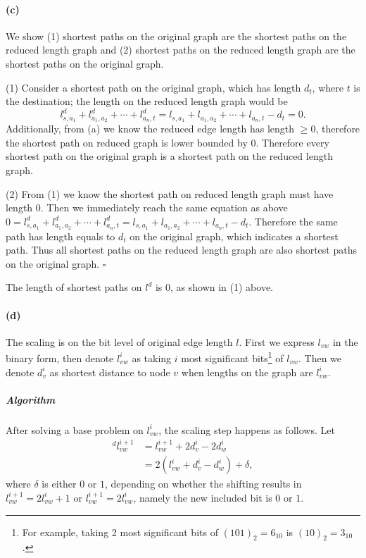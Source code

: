 \documentclass[12pt]{article}
\begin{document}
\paragraph{(c)} We show (1) shortest paths on the original graph are the shortest paths on the reduced length graph and (2) shortest paths on the reduced length graph are the shortest paths on the original graph. 

(1) Consider a shortest path on the original graph, which has length $d_t$, where $t$ is the destination; the length on the reduced length graph would be 
$$l_{s,a_1}^d + l_{a_1,a_2}^d + \cdots + l_{a_n, t}^d = l_{s,a_1} + l_{a_1,a_2} + \cdots + l_{a_n, t} - d_t = 0.$$ Additionally, from (a) we know the reduced edge length has length $\geq 0$, therefore the shortest path on reduced graph is lower bounded by $0$. Therefore every shortest path on the original graph is a shortest path on the reduced length graph. 

(2) From (1) we know the shortest path on reduced length graph must have length 0. Then we immediately reach the same equation as above $0 = l_{s,a_1}^d + l_{a_1,a_2}^d + \cdots + l_{a_n, t}^d = l_{s,a_1} + l_{a_1,a_2} + \cdots + l_{a_n, t} - d_t.$ Therefore the same path has length equals to $d_t$ on the original graph, which indicates a shortest path. Thus all shortest paths on the reduced length graph are also shortest paths on the original graph. $\square$

The length of shortest paths on $l^d$ is 0, as shown in (1) above.

\paragraph{(d)} The scaling is on the bit level of original edge length $l$. First we express $l_{vw}$ in the binary form, then denote $l_{vw}^i$ as taking $i$ most significant bits\footnote{For example, taking 2 most significant bits of $(101)_2= 6_{10}$ is $(10)_2 = 3_{10}$.} of $l_{vw}$. Then we denote $d_v^i$ as shortest distance to node $v$ when lengths on the graph are $l_{vw}^i$. 

\subparagraph{Algorithm}
After solving a base problem on $l_{vw}^i$, the scaling step happens as follows. Let 
\begin{align*}
^d l^{i+1}_{vw} &= l^{i+1}_{vw} + 2d^i_v - 2d^i_w \\
&=2(l^{i}_{vw} + d^i_v - d^i_w) + \delta,
\end{align*}
where $\delta$ is either $0$ or $1$, depending on whether the shifting results in $l^{i+1}_{vw} = 2l^{i}_{vw} + 1$ or $l^{i+1}_{vw} = 2l^{i}_{vw}$, namely the new included bit is $0$ or $1$.
\end{document}
